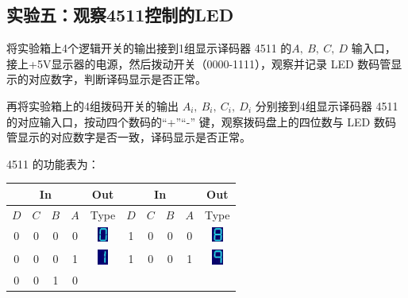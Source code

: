 \documentclass[a4paper,11pt,UTF8]{ctexart}
\begin{document}
\subsection{实验五：观察4511控制的LED}
	\par 将实验箱上4个逻辑开关的输出接到1组显示译码器 4511 的$A,~B,~C,~D$ 输入口，接上+5V显示器的电源，然后拨动开关（0000-1111），观察并记录 LED 数码管显示的对应数字，判断译码显示是否正常。
	\par 再将实验箱上的4组拨码开关的输出 $A_i,~B_i,~C_i,~D_i$ 分别接到4组显示译码器 4511 的对应输入口，按动四个数码的“+”“-” 键，观察拨码盘上的四位数与 LED 数码管显示的对应数字是否一致，译码显示是否正常。
	\par 4511 的功能表为：
	\begin{table}[H]
	 \centering
	 \begin{tabular}{|cccc|c|cccc|c|}\hline
	  \multicolumn{4}{|c|}{In} & Out
	  &\multicolumn{4}{c|}{In} &Out
	  \\\hline
	  $D$&$C$&$B$&$A$ &Type
	  &$D$&$C$&$B$&$A$ &Type
	  \\\hline
	  0&0&0&0&
	  \begin{minipage}{0.1\textwidth}
	   \centering
	   \includegraphics[height=0.5cm]{Digit0}
	  \end{minipage}
	  &1&0&0&0&
	  \begin{minipage}{0.1\textwidth}
	   \centering
	   \includegraphics[height=0.5cm]{Digit8}
	  \end{minipage}
	  \\\hline
	  0&0&0&1&
	  \begin{minipage}{0.1\textwidth}
	   \centering
	   \includegraphics[height=0.5cm]{Digit1}
	  \end{minipage}
	  &1&0&0&1&
	  \begin{minipage}{0.1\textwidth}
	   \centering
	   \includegraphics[height=0.5cm]{Digit9}
	  \end{minipage}
	  \\\hline
	  0&0&1&0&
	  \begin{minipage}{0.1\textwidth}
	   \centering

\end{minipage}
\end{tabular}
\end{table}
\end{document}
